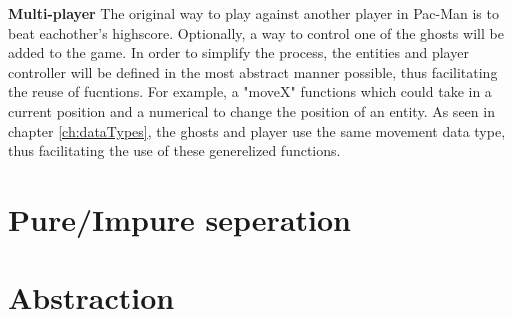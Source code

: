 \documentclass[11pt]{Article}
\begin{document}
\textbf{Multi-player} The original way to play against another player in Pac-Man is to beat eachother's highscore. Optionally, a way to control one of the ghosts will be added to the game. In order to simplify the process, the entities and player controller will be defined in the most abstract manner possible, thus facilitating the reuse of fucntions. For example, a "moveX" functions which could take in a current position and a numerical to change the position of an entity. As seen in chapter \ref{ch:dataTypes}, the ghosts and player use the same movement data type, thus facilitating the use of these generelized functions.



\section{Pure/Impure seperation} \label{ch:pureSeperation}
\section{Abstraction} \label{ch:abstraction}








\end{document}
